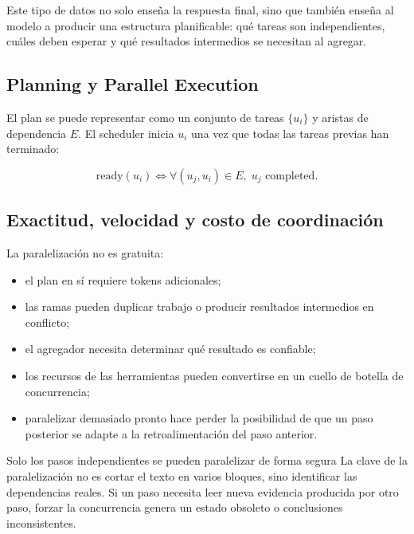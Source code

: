 Este tipo de datos no solo enseña la respuesta final, sino que también enseña al modelo a producir una estructura planificable: qué tareas son independientes, cuáles deben esperar y qué resultados intermedios se necesitan al agregar.

\subsection{Planning y Parallel Execution}


El plan se puede representar como un conjunto de tareas $\{u_i\}$ y aristas de dependencia $E$. El scheduler inicia $u_i$ una vez que todas las tareas previas han terminado:

$$
\mathrm{ready}(u_i)\iff \forall (u_j,u_i)\in E,\;u_j\text{ completed}.
$$


\subsection{Exactitud, velocidad y costo de coordinación}

La paralelización no es gratuita:

\begin{itemize}
    \item el plan en sí requiere tokens adicionales;
    \item las ramas pueden duplicar trabajo o producir resultados intermedios en conflicto;
    \item el agregador necesita determinar qué resultado es confiable;
    \item los recursos de las herramientas pueden convertirse en un cuello de botella de concurrencia;
    \item paralelizar demasiado pronto hace perder la posibilidad de que un paso posterior se adapte a la retroalimentación del paso anterior.
\end{itemize}

\begin{importantbox}{Solo los pasos independientes se pueden paralelizar de forma segura}
La clave de la paralelización no es cortar el texto en varios bloques, sino identificar las dependencias reales. Si un paso necesita leer nueva evidencia producida por otro paso, forzar la concurrencia genera un estado obsoleto o conclusiones inconsistentes.
\end{importantbox}

